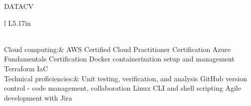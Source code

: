 \documentclass[letterpaper]{article}
\newenvironment{skillslist}
        {
            \hspace*{-0.07in}\begin{tabular}[t]{ l L{5.17in} }
        }{
            \end{tabular}
        }
\newcommand{\impt}[1]{\uline{#1}}
\begin{document}
\begin{taggedblock}{DATACV}
\begin{skillslist}
                \\
            Cloud computing:&
                AWS Certified Cloud Practitioner Certification \linebreak
                Azure Fundamentals Certification \linebreak
                Docker containerization setup and management \linebreak
                Terraform IaC \linebreak
                \\
            Technical proficiencies:&
                Unit testing, verification, and analysis\linebreak
                GitHub version control - code management, collaboration \linebreak
                Linux CLI and shell scripting \linebreak
                Agile development with Jira \linebreak
                \\
        \end{skillslist}
    \end{taggedblock}
\end{document}
